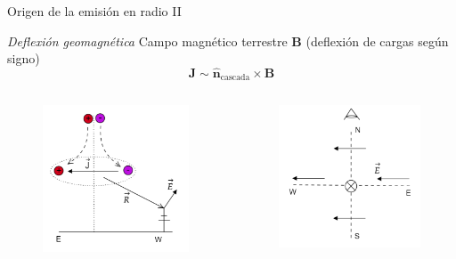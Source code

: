 \documentclass{beamer}
\newcommand{\vect}[1]{\boldsymbol{\mathbf{#1}}}
\begin{document}
\begin{frame}{Origen de la emisión en radio II}

\begin{block}{\centering\textit{Deflexión geomagnética}}
	\centering Campo magnético terrestre $\vect{B}$ (deflexión de cargas según signo)
	$$\vect{J}\sim \hat{\vect{n}}_{\text{cascada}}\times\vect{B}$$  
\end{block}

\begin{columns}
	
	\begin{figure}[H]
		\centering
		\includegraphics[width=.6\linewidth]{figures/Geomag_deflexion_1}
	\end{figure}
	\begin{figure}[H]
		\centering
		\includegraphics[width=.6\linewidth]{figures/Geomag_deflexion_2}
	\end{figure}
\end{columns}
\end{frame}
\end{document}
